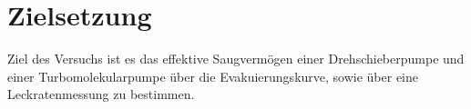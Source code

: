 
\section{Zielsetzung}
\label{sec:Zielsetzung}

Ziel des Versuchs ist es das effektive Saugvermögen einer Drehschieberpumpe und einer Turbomolekularpumpe über die Evakuierungskurve, sowie über eine Leckratenmessung zu bestimmen.
